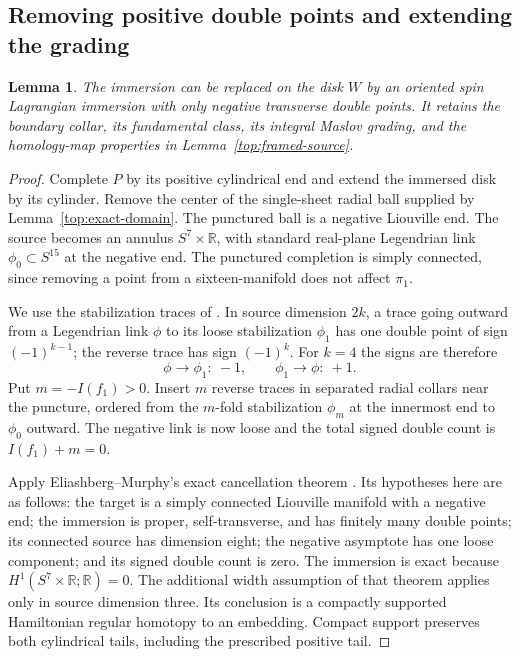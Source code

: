 \documentclass[11pt]{article}
\newtheorem{lemma}[theorem]{Lemma}
\theoremstyle{definition}
\theoremstyle{remark}
\newcommand{\R}{\mathbb R}
\numberwithin{equation}{section}
\begin{document}
\subsection{Removing positive double points and extending the grading}

\begin{lemma}\label{top:negative-doubles}
The immersion can be replaced on the disk $W$ by an oriented spin
Lagrangian immersion with only negative transverse double points.
It retains the boundary collar, its fundamental class, its integral
Maslov grading, and the homology-map properties in
Lemma~\ref{top:framed-source}.
\end{lemma}

\begin{proof}
Complete $P$ by its positive cylindrical end and extend the
immersed disk by its cylinder.  Remove the center of the
single-sheet radial ball supplied by Lemma~\ref{top:exact-domain}.
The punctured ball is a negative Liouville end.  The source
becomes an annulus $S^7\times\R$, with standard real-plane
Legendrian link $\phi_0\subset S^{15}$ at the negative end.
The punctured completion is simply connected, since removing
a point from a sixteen-manifold does not affect $\pi_1$.

We use the stabilization traces of
\cite[Lemma~3.2 and proof of Lemma~3.4]{eems}.  In source
dimension $2k$, a trace going outward from a Legendrian link
$\phi$ to its loose stabilization $\phi_1$ has one double
point of sign $(-1)^{k-1}$; the reverse trace has sign
$(-1)^k$.  For $k=4$ the signs are therefore
\begin{equation}\label{top:trace-signs}
 \phi\longrightarrow\phi_1:\ -1,
 \qquad \phi_1\longrightarrow\phi:\ +1.
\end{equation}
Put $m=-I(f_1)>0$.  Insert $m$ reverse traces in separated
radial collars near the puncture, ordered from the $m$-fold
stabilization $\phi_m$ at the innermost end to $\phi_0$
outward.  The negative link is now loose and the total signed
double count is $I(f_1)+m=0$.

Apply Eliashberg--Murphy's exact cancellation theorem
\cite[Theorem~2.3]{em-caps}.  Its hypotheses here are as
follows: the target is a simply connected Liouville manifold
with a negative end; the immersion is proper, self-transverse,
and has finitely many double points; its connected source has
dimension eight; the negative asymptote has one loose
component; and its signed double count is zero.  The
immersion is exact because $H^1(S^7\times\R;\R)=0$.
The additional width assumption of that theorem applies
only in source dimension three.  Its conclusion is a
compactly supported Hamiltonian regular homotopy to an
embedding.  Compact support preserves both cylindrical
tails, including the prescribed positive tail.


\end{proof}
\end{document}
